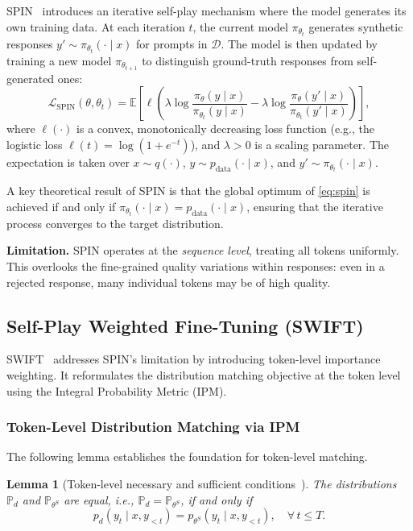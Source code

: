 \documentclass[11pt,a4paper]{article}
\newtheorem{lemma}[theorem]{Lemma}
\newcommand{\Pd}{\mathbb{P}_d}
\newcommand{\Ps}{\mathbb{P}_{\theta^S}}
\newcommand{\E}{\mathbb{E}}
\begin{document}
SPIN~\cite{chen2024spin} introduces an iterative self-play mechanism where the model generates its own training data. At each iteration $t$, the current model $\pi_{\theta_t}$ generates synthetic responses $y' \sim \pi_{\theta_t}(\cdot \mid x)$ for prompts in $\mathcal{D}$. The model is then updated by training a new model $\pi_{\theta_{t+1}}$ to distinguish ground-truth responses from self-generated ones:
\begin{equation}
    \mathcal{L}_{\mathrm{SPIN}}(\theta, \theta_t) = \E \left[ \ell \left( \lambda \log \frac{\pi_\theta(y \mid x)}{\pi_{\theta_t}(y \mid x)} - \lambda \log \frac{\pi_\theta(y' \mid x)}{\pi_{\theta_t}(y' \mid x)} \right) \right],
    \label{eq:spin}
\end{equation}
where $\ell(\cdot)$ is a convex, monotonically decreasing loss function (e.g., the logistic loss $\ell(t) = \log(1 + e^{-t})$), and $\lambda > 0$ is a scaling parameter. The expectation is taken over $x \sim q(\cdot)$, $y \sim p_{\mathrm{data}}(\cdot \mid x)$, and $y' \sim \pi_{\theta_t}(\cdot \mid x)$.

A key theoretical result of SPIN is that the global optimum of \eqref{eq:spin} is achieved if and only if $\pi_{\theta_t}(\cdot \mid x) = p_{\mathrm{data}}(\cdot \mid x)$, ensuring that the iterative process converges to the target distribution.

\textbf{Limitation.} SPIN operates at the \emph{sequence level}, treating all tokens uniformly. This overlooks the fine-grained quality variations within responses: even in a rejected response, many individual tokens may be of high quality.

\subsection{Self-Play Weighted Fine-Tuning (SWIFT)}
\label{subsec:swift}

SWIFT~\cite{le2025swift} addresses SPIN's limitation by introducing token-level importance weighting. It reformulates the distribution matching objective at the token level using the Integral Probability Metric (IPM).

\subsubsection{Token-Level Distribution Matching via IPM}

The following lemma establishes the foundation for token-level matching.

\begin{lemma}[Token-level necessary and sufficient conditions~\cite{le2025swift}]
\label{lem:token_matching}
The distributions $\Pd$ and $\Ps$ are equal, i.e., $\Pd = \Ps$, if and only if
\begin{equation}
    p_d(y_t \mid x, y_{<t}) = p_{\theta^S}(y_t \mid x, y_{<t}), \quad \forall\, t \leq T.
    \label{eq:token_matching}
\end{equation}
\end{lemma}
\end{document}
